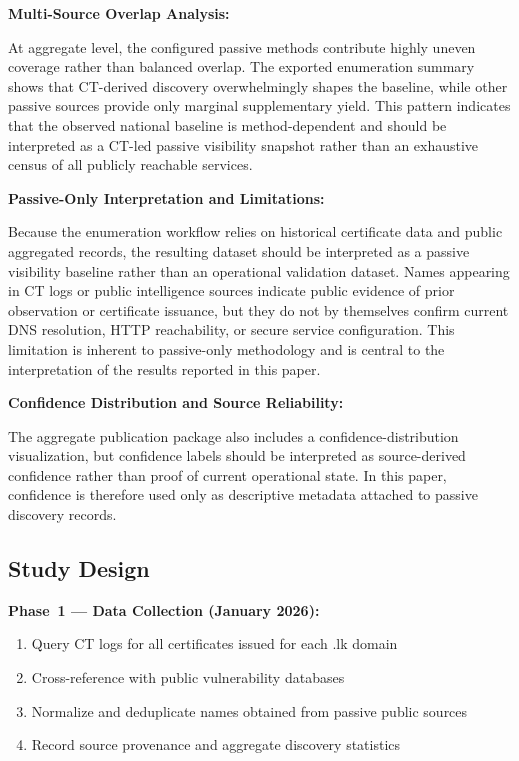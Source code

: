 \documentclass[preprint,review,12pt]{elsarticle}
\begin{document}
\textbf{Multi-Source Overlap Analysis:}

At aggregate level, the configured passive methods contribute highly uneven coverage rather than balanced overlap. The exported enumeration summary shows that CT-derived discovery overwhelmingly shapes the baseline, while other passive sources provide only marginal supplementary yield. This pattern indicates that the observed national baseline is method-dependent and should be interpreted as a CT-led passive visibility snapshot rather than an exhaustive census of all publicly reachable services.

\textbf{Passive-Only Interpretation and Limitations:}

Because the enumeration workflow relies on historical certificate data and public aggregated records, the resulting dataset should be interpreted as a passive visibility baseline rather than an operational validation dataset. Names appearing in CT logs or public intelligence sources indicate public evidence of prior observation or certificate issuance, but they do not by themselves confirm current DNS resolution, HTTP reachability, or secure service configuration. This limitation is inherent to passive-only methodology and is central to the interpretation of the results reported in this paper.

\textbf{Confidence Distribution and Source Reliability:}

The aggregate publication package also includes a confidence-distribution visualization, but confidence labels should be interpreted as source-derived confidence rather than proof of current operational state. In this paper, confidence is therefore used only as descriptive metadata attached to passive discovery records.

\subsection{Study Design}

\textbf{Phase~1 --- Data Collection (January 2026):}
\begin{enumerate}
    \item Query CT logs for all certificates issued for each .lk domain
    \item Cross-reference with public vulnerability databases
    \item Normalize and deduplicate names obtained from passive public sources
    \item Record source provenance and aggregate discovery statistics
\end{enumerate}
\end{document}
